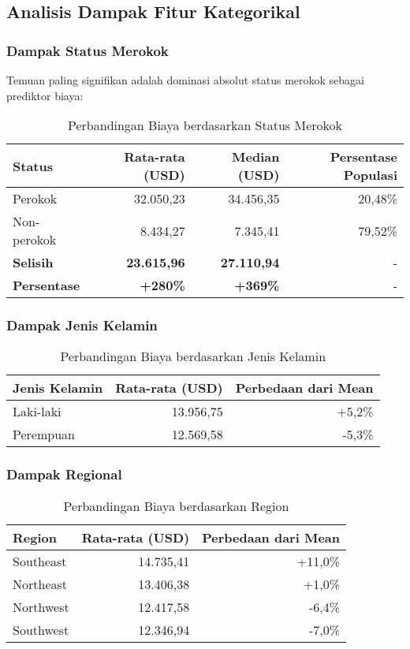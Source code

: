 \subsection{Analisis Dampak Fitur Kategorikal}
\label{subsec:dampak-kategorikal}

\subsubsection{Dampak Status Merokok}
Temuan paling signifikan adalah dominasi absolut status merokok sebagai prediktor biaya:

\begin{table}[H]
\centering
\caption{Perbandingan Biaya berdasarkan Status Merokok}
\label{tab:smoking-impact}
\begin{tabular}{|l|r|r|r|}
\hline
\textbf{Status} & \textbf{Rata-rata (USD)} & \textbf{Median (USD)} & \textbf{Persentase Populasi} \\
\hline
Perokok & 32.050,23 & 34.456,35 & 20,48\% \\
Non-perokok & 8.434,27 & 7.345,41 & 79,52\% \\
\hline
\textbf{Selisih} & \textbf{23.615,96} & \textbf{27.110,94} & - \\
\textbf{Persentase} & \textbf{+280\%} & \textbf{+369\%} & - \\
\hline
\end{tabular}
\end{table}

\subsubsection{Dampak Jenis Kelamin}
\begin{table}[H]
\centering
\caption{Perbandingan Biaya berdasarkan Jenis Kelamin}
\label{tab:gender-impact}
\begin{tabular}{|l|r|r|}
\hline
\textbf{Jenis Kelamin} & \textbf{Rata-rata (USD)} & \textbf{Perbedaan dari Mean} \\
\hline
Laki-laki & 13.956,75 & +5,2\% \\
Perempuan & 12.569,58 & -5,3\% \\
\hline
\end{tabular}
\end{table}

\subsubsection{Dampak Regional}
\begin{table}[H]
\centering
\caption{Perbandingan Biaya berdasarkan Region}
\label{tab:region-impact}
\begin{tabular}{|l|r|r|}
\hline
\textbf{Region} & \textbf{Rata-rata (USD)} & \textbf{Perbedaan dari Mean} \\
\hline
Southeast & 14.735,41 & +11,0\% \\
Northeast & 13.406,38 & +1,0\% \\
Northwest & 12.417,58 & -6,4\% \\
Southwest & 12.346,94 & -7,0\% \\
\hline
\end{tabular}
\end{table}

